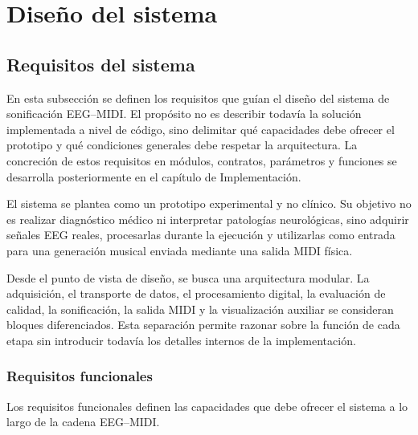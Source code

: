 \documentclass[../main.tex]{subfiles}
\begin{document}
\section{Diseño del sistema}

\subsection{Requisitos del sistema}

En esta subsección se definen los requisitos que guían el diseño del sistema de sonificación EEG--MIDI. El propósito no es describir todavía la solución implementada a nivel de código, sino delimitar qué capacidades debe ofrecer el prototipo y qué condiciones generales debe respetar la arquitectura. La concreción de estos requisitos en módulos, contratos, parámetros y funciones se desarrolla posteriormente en el capítulo de Implementación.

El sistema se plantea como un prototipo experimental y no clínico. Su objetivo no es realizar diagnóstico médico ni interpretar patologías neurológicas, sino adquirir señales EEG reales, procesarlas durante la ejecución y utilizarlas como entrada para una generación musical enviada mediante una salida MIDI física.

Desde el punto de vista de diseño, se busca una arquitectura modular. La adquisición, el transporte de datos, el procesamiento digital, la evaluación de calidad, la sonificación, la salida MIDI y la visualización auxiliar se consideran bloques diferenciados. Esta separación permite razonar sobre la función de cada etapa sin introducir todavía los detalles internos de la implementación.

\subsubsection{Requisitos funcionales}

Los requisitos funcionales definen las capacidades que debe ofrecer el sistema a lo largo de la cadena EEG--MIDI.
\end{document}
